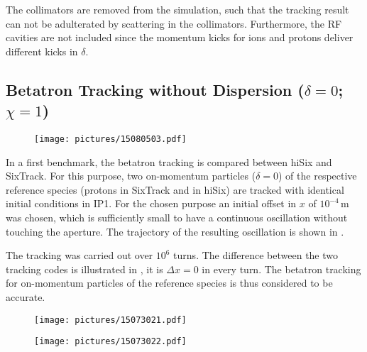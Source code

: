 The collimators are removed from the simulation, such that the tracking result can not be adulterated by scattering in the collimators. Furthermore, the RF cavities are not included since the momentum kicks for ions and protons deliver different kicks in $\delta$.


\subsection{Betatron Tracking without Dispersion ($\delta = 0$; $\chi=1$)}


  \begin{figure}[b]
  \centering
  \texttt{[image: pictures/15080503.pdf]}
  \caption{}  
  \label{pic:15080502}
  \end{figure}





In a first benchmark, the betatron tracking is compared between hiSix and SixTrack. For this purpose, two on-momentum particles ($\delta=0$) of the respective reference species (protons in SixTrack and \lead in hiSix) are tracked with identical initial conditions in IP1. For the chosen purpose an initial offset in $x$ of $10^{-4}\,$m was chosen, which is sufficiently small to have a continuous oscillation without touching the aperture. The trajectory of the resulting oscillation is shown in . 

The tracking was carried out over $10^6$ turns. The difference between the two tracking codes is illustrated in , it is $\Delta x=0$ in every turn. The betatron tracking for on-momentum particles of the reference species is thus considered to be accurate.

\begin{figure}[t]
\centering
\begin{minipage}[t]{0.49\textwidth}
\texttt{[image: pictures/15073021.pdf]}
\end{minipage}
\begin{minipage}[t]{0.49\textwidth}
\texttt{[image: pictures/15073022.pdf]}
\end{minipage}
  \caption{}  
  \label{pic:15073001}
\end{figure}





